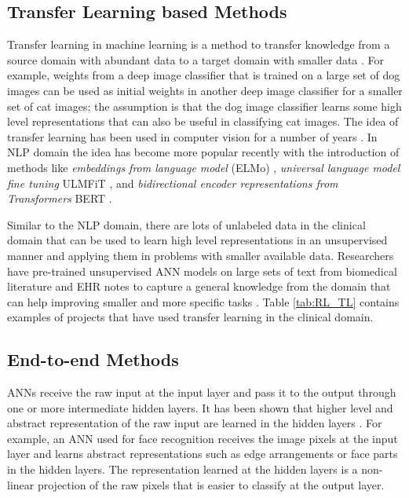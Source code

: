


\subsection{Transfer Learning based Methods}
Transfer learning in machine learning is a method to transfer knowledge from a source domain with abundant data to a target domain with smaller data \cite{tan2018TLsurvey}. For example, weights from a deep image classifier that is trained on a large set of dog images can be used as initial weights in another deep image classifier for a smaller set of cat images; the assumption is that the dog image classifier learns some high level representations that can also be useful in classifying cat images. The idea of transfer learning has been used in computer vision for a number of years \cite{krizhevsky2012imagenet}. In NLP domain the idea has become more popular recently with the introduction of methods like \textit{embeddings from language model} (ELMo) \cite{peters2018deep},  \textit{universal language model fine tuning} ULMFiT \cite{howard2018universal}, and \textit{bidirectional encoder representations from Transformers} BERT \cite{devlin2018bert}.

Similar to the NLP domain, there are lots of unlabeled data in the clinical domain that can be used to learn high level representations in an unsupervised manner and applying them in problems with smaller available data. Researchers have pre-trained unsupervised ANN models on large sets of text from biomedical literature and EHR notes to capture a general knowledge from the domain that can help improving smaller and more specific tasks \cite{Dubois2018, Lee2020}. Table \ref{tab:RL_TL} contains examples of projects that have used transfer learning in the clinical domain.



\subsection{End-to-end Methods}
ANNs receive the raw input at the input layer and pass it to the output through one or more intermediate hidden layers. It has been shown that higher level and abstract representation of the raw input are learned in the hidden layers \cite{lecun2015deep}. For example, an ANN used for face recognition receives the image pixels at the input layer and learns abstract representations such as edge arrangements or face parts in the hidden layers. The representation learned at the hidden layers is a non-linear projection of the raw pixels that is easier to classify at the output layer. 

